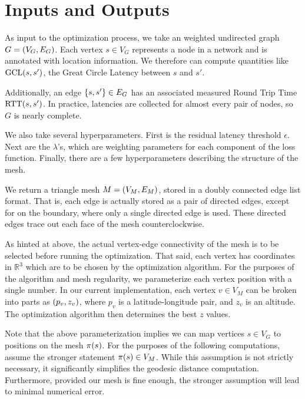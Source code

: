 \section{Inputs and Outputs}
As input to the optimization process, we take an weighted undirected graph \(G = \pof{V_G, E_G}\). Each vertex \(s \in V_G\) represents a node in a network and is annotated with location information. We therefore can compute quantities like \(\GCL\pof{s, s'}\), the Great Circle Latency between \(s\) and \(s'\).

Additionally, an edge \(\cof{s, s'} \in E_G\) has an associated measured Round Trip Time \(\RTT\pof{s, s'}\). In practice, latencies are collected for almost every pair of nodes, so \(G\) is nearly complete.

We also take several hyperparameters. First is the residual latency threshold \(\epsilon\). Next are the \(\lambda\)'s, which are weighting parameters for each component of the loss function. Finally, there are a few hyperparameters describing the structure of the mesh.

We return a triangle mesh \(M = \pof{V_M, E_M}\), stored in a doubly connected edge list format. That is, each edge is actually stored as a pair of directed edges, except for on the boundary, where only a single directed edge is used. These directed edges trace out each face of the mesh counterclockwise.

As hinted at above, the actual vertex-edge connectivity of the mesh is to be selected before running the optimization. That said, each vertex has coordinates in \(\mathbb{R}^3\) which are to be chosen by the optimization algorithm. For the purposes of the algorithm and mesh regularity, we parameterize each vertex position with a single number. In our current implementation, each vertex \(v \in V_M\) can be broken into parts as \(\pof{p_v, z_v}\), where \(p_v\) is a latitude-longitude pair, and \(z_v\) is an altitude. The optimization algorithm then determines the best \(z\) values.

Note that the above parameterization implies we can map vertices \(s \in V_G\) to positions on the mesh \(\pi\pof{s}\). For the purposes of the following computations, assume the stronger statement \(\pi\pof{s} \in V_M\). While this assumption is not strictly necessary, it significantly simplifies the geodesic distance computation. Furthermore, provided our mesh is fine enough, the stronger assumption will lead to minimal numerical error.
